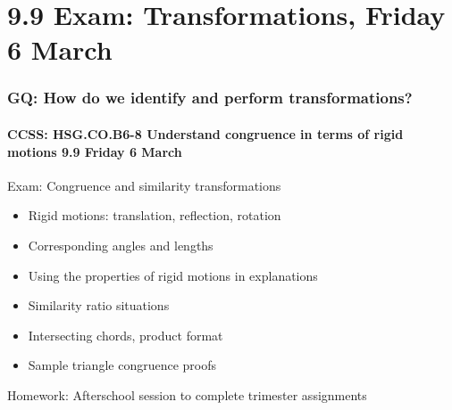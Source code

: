 \documentclass{beamer}
\begin{document}
\section{9.9 Exam: Transformations, Friday 6 March}
\frame
{
  \frametitle{GQ: How do we identify and perform transformations?}
  \framesubtitle{CCSS: HSG.CO.B6-8 Understand congruence in terms of rigid motions \hfill \alert{9.9 Friday 6 March}}
  \begin{block}{Exam: Congruence and similarity transformations}
    \begin{itemize}
      \item Rigid motions: translation, reflection, rotation
      \item Corresponding angles and lengths
      \item Using the properties of rigid motions in explanations
      \item Similarity ratio situations
      \item Intersecting chords, product format
      \item Sample triangle congruence proofs
    \end{itemize}
    \end{block}
    Homework: Afterschool session to complete trimester assignments
}
\end{document}
